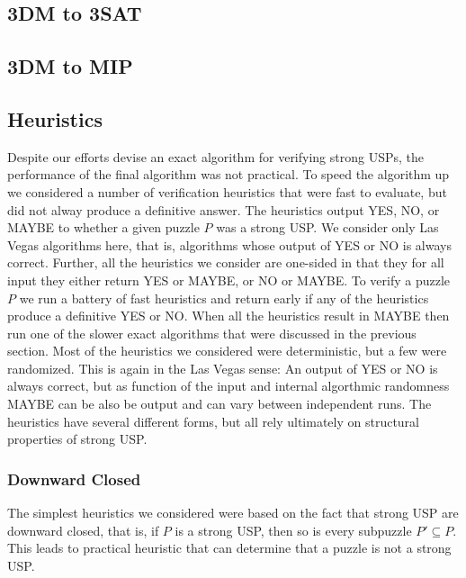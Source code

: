 \documentclass[11pt]{article}
\newcommand\sse{\subseteq}
\begin{document}
\subsection{3DM to 3SAT}

\subsection{3DM to MIP}

\label{subsec:3sat}

\subsection{Heuristics}
\label{sec:heuristic}

Despite our efforts devise an exact algorithm for verifying strong
USPs, the performance of the final algorithm was not practical.  To
speed the algorithm up we considered a number of verification
heuristics that were fast to evaluate, but did not alway produce a
definitive answer.  The heuristics output YES, NO, or MAYBE to whether
a given puzzle $P$ was a strong USP.  We consider only Las Vegas
algorithms here, that is, algorithms whose output of YES or NO is
always correct.  Further, all the heuristics we consider are one-sided
in that they for all input they either return YES or MAYBE, or NO or
MAYBE.  To verify a puzzle $P$ we run a battery of fast heuristics and
return early if any of the heuristics produce a definitive YES or NO.
When all the heuristics result in MAYBE then run one of the slower
exact algorithms that were discussed in the previous section.  Most of
the heuristics we considered were deterministic, but a few were
randomized.  This is again in the Las Vegas sense: An output of YES or
NO is always correct, but as function of the input and internal
algorthmic randomness MAYBE can be also be output and can vary between
independent runs.  The heuristics have several different forms, but
all rely ultimately on structural properties of strong USP.

\subsubsection{Downward Closed}

The simplest heuristics we considered were based on the fact that
strong USP are downward closed, that is, if $P$ is a strong USP, then
so is every subpuzzle $P' \sse P$.  This leads to practical heuristic
that can determine that a puzzle is not a strong USP.
\end{document}
